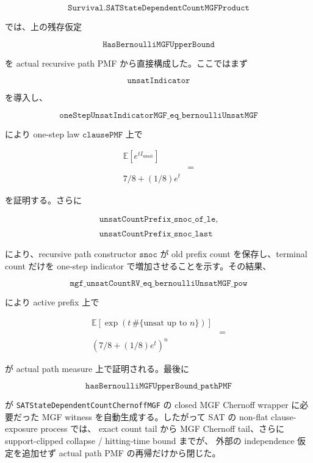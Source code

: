 \documentclass[12pt,a4paper]{article}
\begin{document}
\[
\texttt{Survival.SATStateDependentCountMGFProduct}
\]

では、上の残存仮定

\[
\texttt{HasBernoulliMGFUpperBound}
\]

を actual recursive path PMF から直接構成した。ここではまず

\[
\texttt{unsatIndicator}
\]

を導入し、

\[
\texttt{oneStepUnsatIndicatorMGF\_eq\_bernoulliUnsatMGF}
\]

により one-step law \(\texttt{clausePMF}\) 上で

\[
\begin{aligned}
\mathbb E[e^{t I_{\mathrm{unsat}}}] \\
&= \\
7/8+(1/8)e^t
\end{aligned}
\]

を証明する。さらに

\[
\begin{aligned}
\texttt{unsatCountPrefix\_snoc\_of\_le}, \\
\qquad \\
\texttt{unsatCountPrefix\_snoc\_last}
\end{aligned}
\]

により、recursive path constructor \(\texttt{snoc}\) が old prefix count を保存し、terminal count だけを one-step indicator で増加させることを示す。その結果、

\[
\texttt{mgf\_unsatCountRV\_eq\_bernoulliUnsatMGF\_pow}
\]

により active prefix 上で

\[
\begin{aligned}
\mathbb E[\exp(t\,\#\{\text{unsat up to }n\})] \\
&= \\
\left(7/8+(1/8)e^t\right)^n
\end{aligned}
\]

が actual path measure 上で証明される。最後に

\[
\texttt{hasBernoulliMGFUpperBound\_pathPMF}
\]

が \texttt{SATStateDependentCountChernoffMGF} の closed MGF Chernoff wrapper に必要だった MGF witness を自動生成する。したがって SAT の non-flat clause-exposure process では、 exact count tail から MGF Chernoff tail、さらに support-clipped collapse / hitting-time bound までが、 外部の independence 仮定を追加せず actual path PMF の再帰だけから閉じた。
\end{document}
